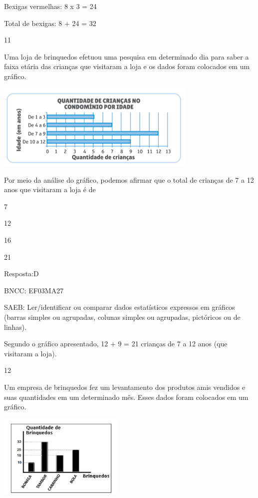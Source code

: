 \begin{escolha}
{\begin{escolha}
{Bexigas vermelhas: 8 x 3 = 24

Total de bexigas: 8 + 24 = 32

\num{11}

Uma loja de brinquedos efetuou uma pesquisa em determinado dia para
saber a faixa etária das crianças que visitaram a loja e os dados foram
colocados em um gráfico.


\includegraphics[width=3.77564in,height=1.60972in]{media/image136.png}

Por meio da análise do gráfico, podemos afirmar que o total de crianças de 7 a 12 anos que visitaram a loja é de

\begin{escolha}

\item
  7
\item
  12
\item
  16
\item
  21
\end{escolha}

Resposta:D

BNCC: EF03MA27

SAEB: Ler/identificar ou comparar dados estatísticos
expressos em gráficos (barras simples ou agrupadas, colunas simples ou
agrupadas, pictóricos ou de linhas).

Segundo o gráfico apresentado, 12 + 9 = 21 crianças de 7 a 12 anos (que visitaram a loja).

\num{12}

Um empresa de brinquedos fez um levantamento dos produtos amis vendidos
e suas quantidades em um determinado mês. Esses dados foram colocados em um gráfico.


\includegraphics[width=2.35294in,height=1.56863in]{media/image137.png}

}
\end{escolha}}
\end{escolha}
